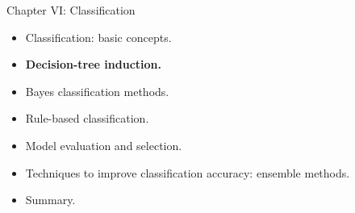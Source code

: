 \documentclass[aspectratio=169,t,table]{beamer}
\begin{document}
  {
    \begin{frame}{Chapter VI: Classification}
        \begin{itemize}
            \item Classification: basic concepts.
            \item \textbf{Decision-tree induction.}
            \item Bayes classification methods.
            \item Rule-based classification.
            \item Model evaluation and selection.
            \item Techniques to improve classification accuracy: ensemble methods.
            \item Summary.
        \end{itemize}
    \end{frame}
  }
\end{document}
